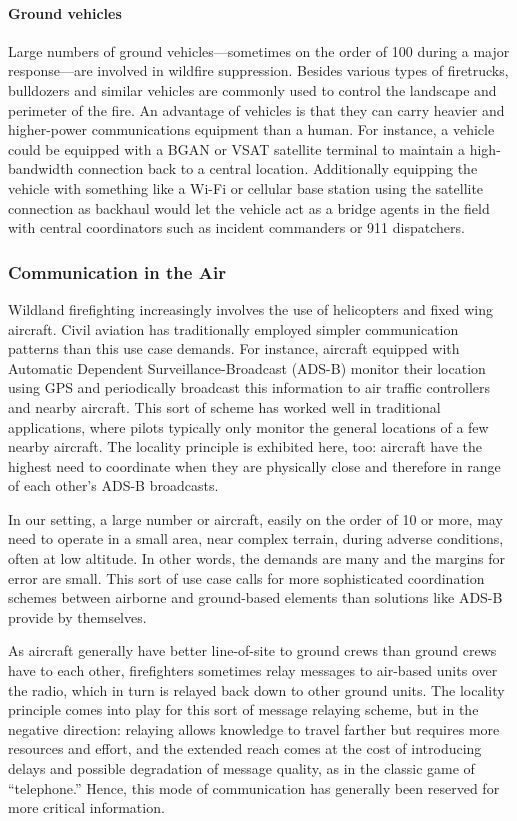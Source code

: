 \documentclass[]             %
{NASA}                       %
\theoremstyle{definition}
\begin{document}
\paragraph{Ground vehicles}
Large numbers of ground vehicles---sometimes on the order of 100
during a major response---are involved in wildfire
suppression. Besides various types of firetrucks, bulldozers and
similar vehicles are commonly used to control the landscape and
perimeter of the fire. An advantage of vehicles is that they can carry
heavier and higher-power communications equipment than a human. For
instance, a vehicle could be equipped with a BGAN or VSAT satellite
terminal to maintain a high-bandwidth connection back to a central
location. Additionally equipping the vehicle with something like a
Wi-Fi or cellular base station using the satellite connection as
backhaul would let the vehicle act as a bridge agents in the field
with central coordinators such as incident commanders or 911
dispatchers.

\subsubsection{Communication in the Air}
Wildland firefighting increasingly involves the use of helicopters and
fixed wing aircraft. Civil aviation has traditionally employed simpler
communication patterns than this use case demands. For instance,
aircraft equipped with Automatic Dependent Surveillance-Broadcast
(ADS-B) monitor their location using GPS and periodically broadcast
this information to air traffic controllers and nearby aircraft. This
sort of scheme has worked well in traditional applications, where
pilots typically only monitor the general locations of a few nearby
aircraft. The locality principle is exhibited here, too: aircraft have
the highest need to coordinate when they are physically close and
therefore in range of each other's ADS-B broadcasts.

In our setting, a large number or aircraft, easily on the order of 10 or
more, may need to operate in a small area, near complex terrain,
during adverse conditions, often at low altitude. In other words, the
demands are many and the margins for error are small. This sort of use
case calls for more sophisticated coordination schemes between
airborne and ground-based elements than solutions like ADS-B provide
by themselves.

As aircraft generally have better line-of-site to ground crews than
ground crews have to each other, firefighters sometimes relay messages
to air-based units over the radio, which in turn is relayed back down
to other ground units. The locality principle comes into play for this
sort of message relaying scheme, but in the negative direction:
relaying allows knowledge to travel farther but requires more resources and effort,
and the extended reach comes at the cost of introducing delays and
possible degradation of message quality, as in the classic game of
``telephone.'' Hence, this mode of communication has generally been reserved for
more critical information.
\end{document}
